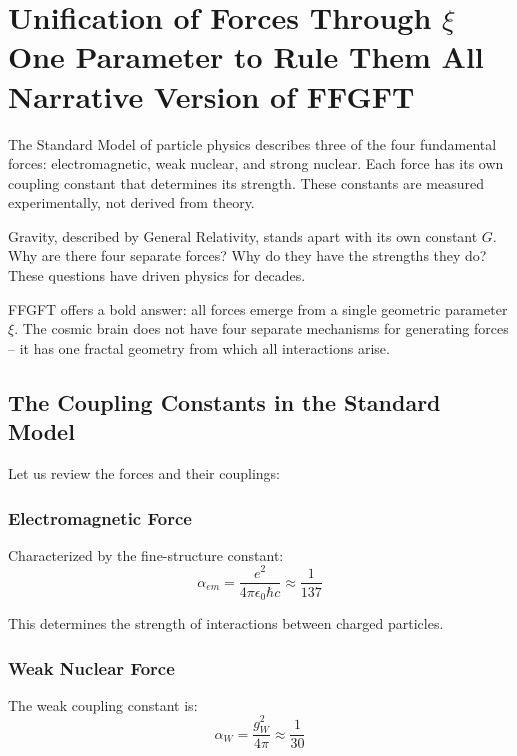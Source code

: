 \chapter{Unification of Forces Through $\xi$  One Parameter to Rule Them All  Narrative Version of FFGFT}



The Standard Model of particle physics describes three of the four fundamental forces: electromagnetic, weak nuclear, and strong nuclear. Each force has its own coupling constant that determines its strength. These constants are measured experimentally, not derived from theory.

Gravity, described by General Relativity, stands apart with its own constant $G$. Why are there four separate forces? Why do they have the strengths they do? These questions have driven physics for decades.

FFGFT offers a bold answer: all forces emerge from a single geometric parameter $\xi$. The cosmic brain does not have four separate mechanisms for generating forces -- it has one fractal geometry from which all interactions arise.

\section{The Coupling Constants in the Standard Model}

Let us review the forces and their couplings:

\subsection{Electromagnetic Force}

Characterized by the fine-structure constant:
\begin{equation}
\alpha_{em} = \frac{e^2}{4\pi\epsilon_0 \hbar c} \approx \frac{1}{137}
\end{equation}

This determines the strength of interactions between charged particles.

\subsection{Weak Nuclear Force}

The weak coupling constant is:
\begin{equation}
\alpha_W = \frac{g_W^2}{4\pi} \approx \frac{1}{30}
\end{equation}

